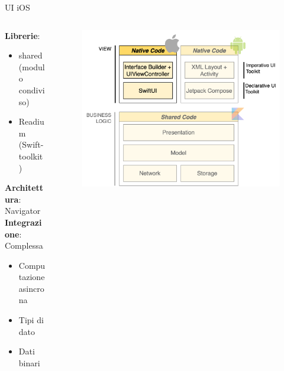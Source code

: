 \begin{frame}{UI iOS}
    \begin{columns}[onlytextwidth]
        \begin{column}{0.4\textwidth}
            \textbf{Librerie}:
            \begin{itemize}
                \item shared (modulo condiviso)
                \item Readium (Swift-toolkit)
            \end{itemize}
            \vspace{2mm}
            \textbf{Architettura}: Navigator\\
            \vspace{2mm}
            \textbf{Integrazione}: Complessa
            \begin{itemize}
                \item Computazione asincrona
                \item Tipi di dato
                \item Dati binari
            \end{itemize}
        \end{column}
        \begin{column}{0.6\textwidth}
             \begin{figure}[H]
                \includegraphics[width=1\textwidth]{img/stack_kmm_ios.png}
            \end{figure}
        \end{column}
    \end{columns}
\end{frame}

